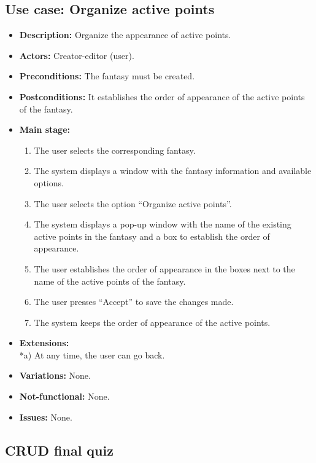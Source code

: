 \subsection{Use case: Organize active points}
\begin{itemize}
	\item \textbf{Description:} Organize the appearance of active points.
	\item \textbf{Actors:} Creator-editor (user).
	\item \textbf{Preconditions:} The fantasy must be created.
	\item \textbf{Postconditions:} It establishes the order of appearance of the active points of the fantasy.
	\item \textbf{Main stage:}
	\begin{enumerate}
		\item The user selects the corresponding fantasy.
		\item The system displays a window with the fantasy information and available options.
		\item The user selects the option ``Organize active points''.
		\item The system displays a pop-up window with the name of the existing active points in the fantasy and a box to establish the order of appearance.
		\item The user establishes the order of appearance in the boxes next to the name of the active points of the fantasy.
		\item The user presses ``Accept'' to save the changes made.
		\item The system keeps the order of appearance of the active points.
	\end{enumerate}
	\item \textbf{Extensions:} \\ *a) At any time, the user can go back.
	\item \textbf{Variations:} None.
	\item \textbf{Not-functional:} None.
	\item \textbf{Issues:} None.
\end{itemize}

\subsection{CRUD final quiz}
\hypertarget{crearquizfinal}{}
